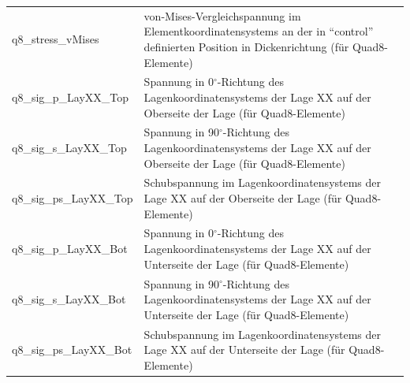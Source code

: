 \documentclass[11pt,titlepage,listof=totoc,bibliography=totoc,twoside]{scrreprt}
\begin{document}
{{\begin{tabularx}{\textwidth}{lX}
q8\_stress\_vMises	& von-Mises-Vergleichspannung im Elementkoordinatensystems an der in ``control'' definierten Position in Dickenrichtung (für Quad8-Elemente) \\
q8\_sig\_p\_LayXX\_Top	& Spannung in 0$^{\circ}$-Richtung des Lagenkoordinatensystems der Lage XX auf der Oberseite der Lage (für Quad8-Elemente) \\
q8\_sig\_s\_LayXX\_Top	& Spannung in 90$^{\circ}$-Richtung des Lagenkoordinatensystems der Lage XX auf der Oberseite der Lage (für Quad8-Elemente) \\
q8\_sig\_ps\_LayXX\_Top	& Schubspannung im Lagenkoordinatensystems der Lage XX auf der Oberseite der Lage (für Quad8-Elemente) \\
q8\_sig\_p\_LayXX\_Bot	& Spannung in 0$^{\circ}$-Richtung des Lagenkoordinatensystems der Lage XX auf der Unterseite der Lage (für Quad8-Elemente) \\
q8\_sig\_s\_LayXX\_Bot	& Spannung in 90$^{\circ}$-Richtung des Lagenkoordinatensystems der Lage XX auf der Unterseite der Lage (für Quad8-Elemente) \\
q8\_sig\_ps\_LayXX\_Bot	& Schubspannung im Lagenkoordinatensystems der Lage XX auf der Unterseite der Lage (für Quad8-Elemente) \\
\bottomrule
\end{tabularx}

}}
\end{document}
